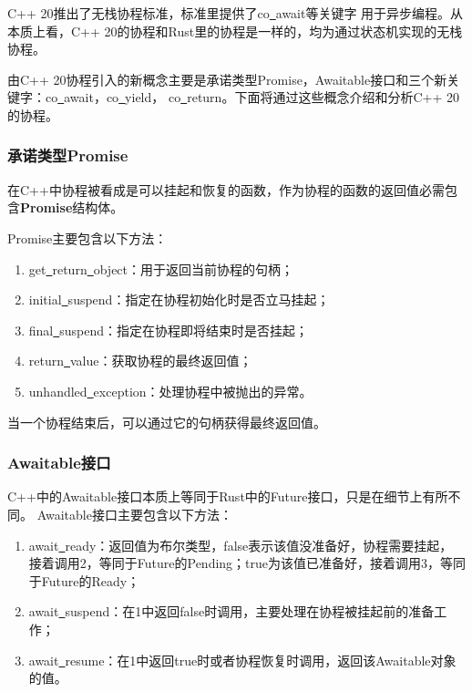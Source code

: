 \documentclass[supercite]{HustGraduPaper}
\theoremstyle{definition}
\begin{document}
C++ 20推出了无栈协程标准，标准里提供了co\underline{~}await等关键字
用于异步编程。从本质上看，C++ 20的协程和Rust里的协程是一样的，均为通过状态机实现的无栈协程。\par

由C++ 20协程引入的新概念主要是承诺类型Promise，Awaitable接口和三个新关键字：co\underline{~}await，co\underline{~}yield，
co\underline{~}return。下面将通过这些概念介绍和分析C++ 20的协程。\par

\subsubsection{承诺类型Promise}

在C++中协程被看成是可以挂起和恢复的函数，作为协程的函数的返回值必需包含\textbf{Promise}结构体。\par

Promise主要包含以下方法：

\begin{enumerate}
  \item get\underline{~}return\underline{~}object：用于返回当前协程的句柄；
  \item initial\underline{~}suspend：指定在协程初始化时是否立马挂起；
  \item final\underline{~}suspend：指定在协程即将结束时是否挂起；
  \item return\underline{~}value：获取协程的最终返回值；
  \item unhandled\underline{~}exception：处理协程中被抛出的异常。
\end{enumerate}

当一个协程结束后，可以通过它的句柄获得最终返回值。\par

\subsubsection{Awaitable接口}

C++中的Awaitable接口本质上等同于Rust中的Future接口，只是在细节上有所不同。
Awaitable接口主要包含以下方法：

\begin{enumerate}
  \item await\underline{~}ready：返回值为布尔类型，false表示该值没准备好，协程需要挂起，
    接着调用2，等同于Future的Pending；true为该值已准备好，接着调用3，等同于Future的Ready；
  \item await\underline{~}suspend：在1中返回false时调用，主要处理在协程被挂起前的准备工作；
  \item await\underline{~}resume：在1中返回true时或者协程恢复时调用，返回该Awaitable对象的值。
\end{enumerate}
\end{document}
